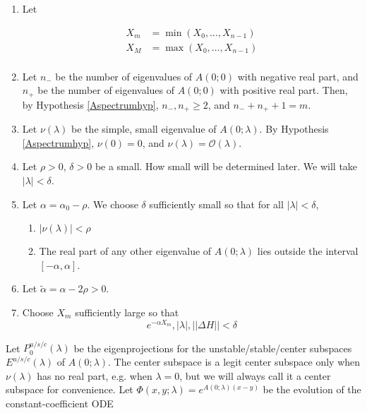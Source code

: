 \documentclass[12pt]{article}
\begin{document}
\begin{enumerate}
	\item Let

	\begin{align*}
	X_m &= \min(X_0, \dots, X_{n-1}) \\
	X_M &= \max(X_0, \dots, X_{n-1}) \\
	\end{align*}

	\item Let $n_-$ be the number of eigenvalues of $A(0; 0)$ with negative real part, and $n_+$ be the number of eigenvalues of $A(0; 0)$ with positive real part. Then, by Hypothesis \ref{Aspectrumhyp}, $n_-, n_+ \geq 2$, and $n_- + n_+ + 1 = m$.

	\item Let $\nu(\lambda)$ be the simple, small eigenvalue of $A(0; \lambda)$. By Hypothesis \ref{Aspectrumhyp}, $\nu(0) = 0$, and $\nu(\lambda) = \mathcal{O}(\lambda)$. 

	\item Let $\rho > 0$, $\delta > 0$ be a small. How small will be determined later. We will take $|\lambda| < \delta$.

	\item Let $\alpha = \alpha_0 - \rho$. We choose $\delta$ sufficiently small so that for all $|\lambda| < \delta$,

	\begin{enumerate}
		\item $|\nu(\lambda)| < \rho$
		\item The real part of any other eigenvalue of $A(0; \lambda)$ lies outside the interval $[-\alpha, \alpha]$.
	\end{enumerate}

	\item Let $\tilde{\alpha} = \alpha - 2 \rho > 0$.

	\item Choose $X_m$ sufficiently large so that
	\begin{equation}
	e^{-\alpha X_m}, |\lambda|, ||\Delta H|| < \delta
	\end{equation}

\end{enumerate}

Let $P^{u/s/c}_0(\lambda)$ be the eigenprojections for the unstable/stable/center subspaces $E^{u/s/c}(\lambda)$ of $A(0; \lambda)$. The center subspace is a legit center subspace only when $\nu(\lambda)$ has no real part, e.g. when $\lambda = 0$, but we will always call it a center subspace for convenience. Let $\Phi(x, y; \lambda) = e^{A(0; \lambda)(x-y)}$ be the evolution of the constant-coefficient ODE
\end{document}
